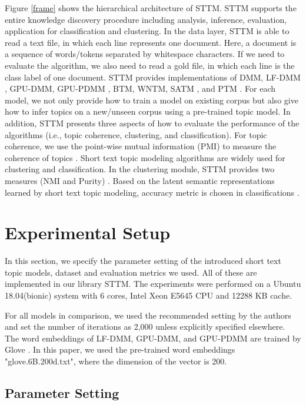 \documentclass[10pt,journal,compsoc]{IEEEtran}
\begin{document}
{Figure \ref{frame} shows the hierarchical architecture of STTM. STTM supports the entire knowledge discovery procedure including analysis, inference, evaluation, application for classification and clustering. In the data layer, STTM is able to read a text file, in which each line represents one document. Here, a document is a sequence of words/tokens separated by whitespace characters. If we need to evaluate the algorithm, we also need to read a gold file, in which each line is the class label of one document. STTM provides implementations of DMM\cite{yin2014dirichlet}, LF-DMM \cite{nguyen2015improving}, GPU-DMM\cite{li2016topic}, GPU-PDMM \cite{li2017enhancing}, BTM\cite{cheng2014btm}, WNTM\cite{zuo2016word}, SATM \cite{quan2015short}, and PTM \cite{zuo2016topic}. For each model, we not only provide how to train a model on existing corpus but also give how to infer topics on a new/unseen corpus using a pre-trained topic model. In addition, STTM presents three aspects of how to evaluate the performance of the algorithms (i.e., topic coherence, clustering, and classification). For topic coherence, we use the point-wise mutual information (PMI) to measure the coherence of topics \cite{zuo2016topic}. Short text topic modeling algorithms are widely used for clustering and classification. In the clustering module, STTM provides two measures (NMI and Purity) \cite{yan2015probabilistic}. Based on the latent semantic representations learned by short text topic modeling, accuracy metric is chosen in classifications \cite{cheng2014btm}.


\section{Experimental Setup}
In this section, we specify the parameter setting of the introduced short text topic models, dataset and evaluation metrics we used. All of these are implemented in our library STTM. The experiments were performed on a Ubuntu 18.04(bionic) system with 6 cores, Intel Xeon E5645 CPU and 12288 KB cache.


For all models in comparison, we used the recommended setting by the authors and set the number of iterations as 2,000 unless explicitly specified elsewhere. The word embeddings of LF-DMM, GPU-DMM, and GPU-PDMM are trained by Glove \cite{pennington2014glove}. In this paper, we used the pre-trained word embeddings "glove.6B.200d.txt", where the dimension of the vector is 200.

\subsection{Parameter Setting}

}
\end{document}

